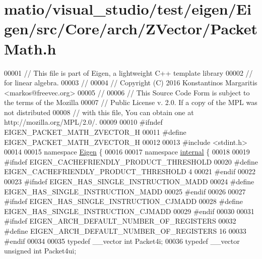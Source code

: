\hypertarget{matio_2visual__studio_2test_2eigen_2_eigen_2src_2_core_2arch_2_z_vector_2_packet_math_8h_source}{}\section{matio/visual\+\_\+studio/test/eigen/\+Eigen/src/\+Core/arch/\+Z\+Vector/\+Packet\+Math.h}
\label{matio_2visual__studio_2test_2eigen_2_eigen_2src_2_core_2arch_2_z_vector_2_packet_math_8h_source}

\begin{DoxyCode}
00001 \textcolor{comment}{// This file is part of Eigen, a lightweight C++ template library}
00002 \textcolor{comment}{// for linear algebra.}
00003 \textcolor{comment}{//}
00004 \textcolor{comment}{// Copyright (C) 2016 Konstantinos Margaritis <markos@freevec.org>}
00005 \textcolor{comment}{//}
00006 \textcolor{comment}{// This Source Code Form is subject to the terms of the Mozilla}
00007 \textcolor{comment}{// Public License v. 2.0. If a copy of the MPL was not distributed}
00008 \textcolor{comment}{// with this file, You can obtain one at http://mozilla.org/MPL/2.0/.}
00009 
00010 \textcolor{preprocessor}{#ifndef EIGEN\_PACKET\_MATH\_ZVECTOR\_H}
00011 \textcolor{preprocessor}{#define EIGEN\_PACKET\_MATH\_ZVECTOR\_H}
00012 
00013 \textcolor{preprocessor}{#include <stdint.h>}
00014 
00015 \textcolor{keyword}{namespace }\hyperlink{namespace_eigen}{Eigen} \{
00016 
00017 \textcolor{keyword}{namespace }\hyperlink{namespaceinternal}{internal} \{
00018 
00019 \textcolor{preprocessor}{#ifndef EIGEN\_CACHEFRIENDLY\_PRODUCT\_THRESHOLD}
00020 \textcolor{preprocessor}{#define EIGEN\_CACHEFRIENDLY\_PRODUCT\_THRESHOLD 4}
00021 \textcolor{preprocessor}{#endif}
00022 
00023 \textcolor{preprocessor}{#ifndef EIGEN\_HAS\_SINGLE\_INSTRUCTION\_MADD}
00024 \textcolor{preprocessor}{#define EIGEN\_HAS\_SINGLE\_INSTRUCTION\_MADD}
00025 \textcolor{preprocessor}{#endif}
00026 
00027 \textcolor{preprocessor}{#ifndef EIGEN\_HAS\_SINGLE\_INSTRUCTION\_CJMADD}
00028 \textcolor{preprocessor}{#define EIGEN\_HAS\_SINGLE\_INSTRUCTION\_CJMADD}
00029 \textcolor{preprocessor}{#endif}
00030 
00031 \textcolor{preprocessor}{#ifndef EIGEN\_ARCH\_DEFAULT\_NUMBER\_OF\_REGISTERS}
00032 \textcolor{preprocessor}{#define EIGEN\_ARCH\_DEFAULT\_NUMBER\_OF\_REGISTERS  16}
00033 \textcolor{preprocessor}{#endif}
00034 
00035 \textcolor{keyword}{typedef} \_\_vector \textcolor{keywordtype}{int}                 Packet4i;
00036 \textcolor{keyword}{typedef} \_\_vector \textcolor{keywordtype}{unsigned} \textcolor{keywordtype}{int}        Packet4ui;

\end{DoxyCode}
